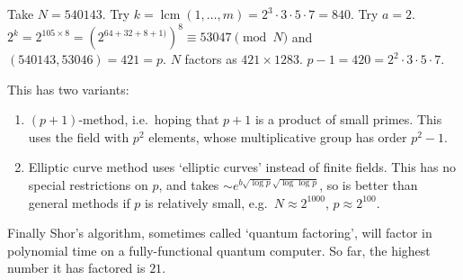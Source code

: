 \documentclass{article}
\begin{document}
\begin{eg}
    Take $N = 540143$. Try $k = \operatorname{lcm}(1,\dotsc,m) = 2^3 \cdot 3 \cdot 5 \cdot 7 = 840$.
    Try $a=2$. $2^k = 2^{105 \times 8} = (2^{64 + 32 + 8 + 1)})^8 \equiv 53047 \pmod{N}$ and $(540143, 53046) = 421 = p$.
    $N$ factors as $421 \times 1283$. $p-1 = 420 = 2^2 \cdot 3 \cdot 5 \cdot 7$.
\end{eg}

This has two variants:
\begin{enumerate}[label=(\arabic*)]
    \item $(p+1)$-method, i.e.\ hoping that $p+1$ is a product of small primes.
        This uses the field with $p^2$ elements, whose multiplicative group has order $p^2 - 1$.
    \item Elliptic curve method uses `elliptic curves' instead of finite fields.
        This has no special restrictions on $p$, and takes $\sim e^{b \sqrt{\log p} \sqrt{\log \log p}}$, so is better than general methods if $p$ is relatively small, e.g.\ $N \approx 2^{1000}$, $p \approx 2^{100}$.
\end{enumerate}

Finally Shor's algorithm, sometimes called `quantum factoring', will factor in polynomial time on a fully-functional quantum computer.
So far, the highest number it has factored is $21$.
\end{document}
